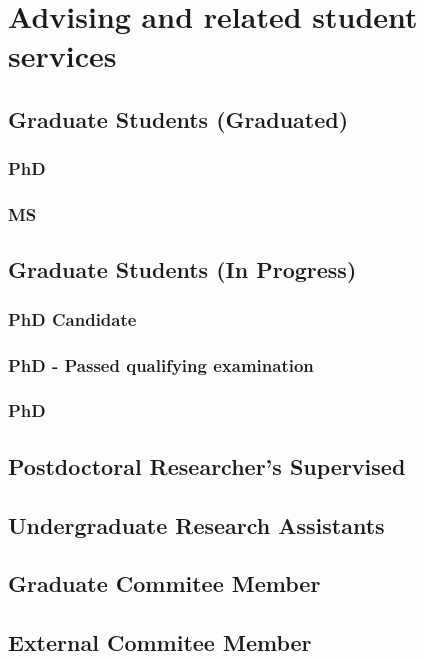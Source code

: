 \section*{Advising and related student services}

\subsection*{Graduate Students (Graduated)}

\subsubsection*{PhD}
\begin{enumerate}
\end{enumerate}

\subsubsection*{MS}
\begin{enumerate}
\end{enumerate}

\subsection*{Graduate Students (In Progress)}

\subsubsection*{PhD Candidate}
\begin{enumerate}
\end{enumerate}

\subsubsection*{PhD - Passed qualifying examination}
\begin{enumerate}
\end{enumerate}

\subsubsection*{PhD}
\begin{enumerate}
\end{enumerate}

\subsection*{Postdoctoral Researcher's Supervised}
  \begin{enumerate}
  \end{enumerate}

\subsection*{Undergraduate Research Assistants}
  \begin{enumerate}
  \end{enumerate}

\subsection*{Graduate Commitee Member}

\subsection*{External Commitee Member}
